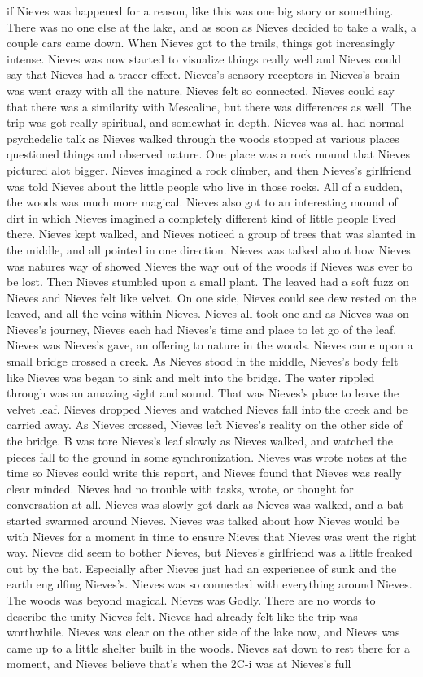 \documentclass[12pt]{book}
\begin{document}
if Nieves was happened for a reason, like this was one big story or something. There was no one else at the lake, and as soon as Nieves decided to take a walk, a couple cars came down. When Nieves got to the trails, things got increasingly intense. Nieves was now started to visualize things really well and Nieves could say that Nieves had a tracer effect. Nieves's sensory receptors in Nieves's brain was went crazy with all the nature. Nieves felt so connected. Nieves could say that there was a similarity with Mescaline, but there was differences as well. The trip was got really spiritual, and somewhat in depth. Nieves was all had normal psychedelic talk as Nieves walked through the woods stopped at various places questioned things and observed nature. One place was a rock mound that Nieves pictured alot bigger. Nieves imagined a rock climber, and then Nieves's girlfriend was told Nieves about the little people who live in those rocks. All of a sudden, the woods was much more magical. Nieves also got to an interesting mound of dirt in which Nieves imagined a completely different kind of little people lived there. Nieves kept walked, and Nieves noticed a group of trees that was slanted in the middle, and all pointed in one direction. Nieves was talked about how Nieves was natures way of showed Nieves the way out of the woods if Nieves was ever to be lost. Then Nieves stumbled upon a small plant. The leaved had a soft fuzz on Nieves and Nieves felt like velvet. On one side, Nieves could see dew rested on the leaved, and all the veins within Nieves. Nieves all took one and as Nieves was on Nieves's journey, Nieves each had Nieves's time and place to let go of the leaf. Nieves was Nieves's gave, an offering to nature in the woods. Nieves came upon a small bridge crossed a creek. As Nieves stood in the middle, Nieves's body felt like Nieves was began to sink and melt into the bridge. The water rippled through was an amazing sight and sound. That was Nieves's place to leave the velvet leaf. Nieves dropped Nieves and watched Nieves fall into the creek and be carried away. As Nieves crossed, Nieves left Nieves's reality on the other side of the bridge. B was tore Nieves's leaf slowly as Nieves walked, and watched the pieces fall to the ground in some synchronization. Nieves was wrote notes at the time so Nieves could write this report, and Nieves found that Nieves was really clear minded. Nieves had no trouble with tasks, wrote, or thought for conversation at all. Nieves was slowly got dark as Nieves was walked, and a bat started swarmed around Nieves. Nieves was talked about how Nieves would be with Nieves for a moment in time to ensure Nieves that Nieves was went the right way. Nieves did seem to bother Nieves, but Nieves's girlfriend was a little freaked out by the bat. Especially after Nieves just had an experience of sunk and the earth engulfing Nieves's. Nieves was so connected with everything around Nieves. The woods was beyond magical. Nieves was Godly. There are no words to describe the unity Nieves felt. Nieves had already felt like the trip was worthwhile. Nieves was clear on the other side of the lake now, and Nieves was came up to a little shelter built in the woods. Nieves sat down to rest there for a moment, and Nieves believe that's when the 2C-i was at Nieves's full 
\end{document}
